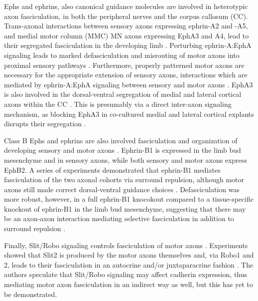 Ephs and ephrins, also canonical guidance molecules \cite{bashaw2010signaling,kolodkin2011mechanisms} are involved in heterotypic axon fasciculation, in both the peripheral nerves and the corpus callosum (CC).
Trans-axonal interactions between sensory axons expressing ephrin-A2 and -A5, and medial motor column (MMC) MN axons expressing EphA3 and A4, lead to their segregated fasciculation in the developing limb \cite{gallarda2008segregation}.
Perturbing ephrin-A:EphA signaling leads to marked defasciculation and misrouting of motor axons into proximal sensory pathways \cite{gallarda2008segregation}.
Furthermore, properly patterned motor axons are necessary for the appropriate extension of sensory axons, interactions which are mediated by ephrin-A:EphA signaling between sensory and motor axons \cite{wang2011anatomical}.
EphA3 is also involved in the dorsal-ventral segregation of medial and lateral cortical axons within the CC \cite{nishikimi2011segregation}.
This is presumably via a direct inter-axon signaling mechanism, as blocking EphA3 in co-cultured medial and lateral cortical explants \invitro{} disrupts their segregation \cite{nishikimi2011segregation}.

Class B Ephs and ephrins are also involved fasciculation and organization of developing sensory and motor axons \cite{luxey2013eph}.
Ephrin-B1 is expressed in the limb bud mesenchyme and in sensory axons, while both sensory and motor axons express EphB2.
A series of experiments demonstrated that ephrin-B1 mediates fasciculation of the two axonal cohorts via surround repulsion, although motor axons still made correct dorsal-ventral guidance choices \cite{luxey2013eph}.
Defasciculation was more robust, however, in a full ephrin-B1 knocokout compared to a tissue-specific knockout of ephrin-B1 in the limb bud mesenchyme, suggesting that there may be an axon-axon interaction mediating selective fasciculation in addition to surround repulsion \cite{luxey2013eph}.

Finally, Slit/Robo signaling controls fasciculation of motor axons \cite{jaworski2012autocrine}.
Experiments \invitro{} showed that Slit2 is produced by the motor axons themselves and, via Robo1 and 2, leads to their fasciculation in an autocrine and/or juxtaparacrine fashion \cite{jaworski2012autocrine}.
The authors speculate that Slit/Robo signaling may affect cadherin expression, thus mediating motor axon fasciculation in an indirect way as well, but this has yet to be demonstrated.